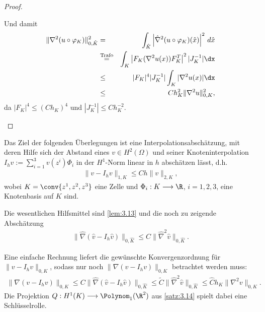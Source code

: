 \begin{proof}
\begin{enumerate}[a)]
        Und damit
        \begin{eqnarray*}
                \|\nabla^2 (u \circ \varphi_K)\|_{0,\hat K}^2
            &=& \int_{\hat K} \left|\hat \nabla^2 (u \circ \varphi_K)(\hat x)
                \right|^2 \,d\hat x \\
            &\stackrel{\text{Trafo}}{=}&
                \int_K \left|F_K(\nabla^2 u(x)) F_K^T\right|^2 |J_K^{-1}| \dx\\
            &\le& |F_K|^4 |J_K^{-1}| \int_K |\nabla^2 u(x)| \dx \\
            &\le& C h_K^2 \|\nabla^2 u\|_{0,K}^2,
        \end{eqnarray*}
        da $|F_K|^4 \le (C h_K)^4$ und $|J_K^{-1}| \le C h_K^{-2}$.   
    \end{enumerate}
\end{proof}


\begin{Ausblick}
    Das Ziel der folgenden Überlegungen ist eine Interpolationsabschätzung, mit deren Hilfe sich der Abstand eines $v \in H^2(\Omega)$ und seiner Knoteninterpolation $I_h v := \sum_{i=1}^3 v(z^i) \Phi_i$ in der $H^1$-Norm linear in $h$ abschätzen lässt, d.h.
    \begin{eqnarray*}
        \|v - I_h v\|_{1,K} \le C h \|v\|_{2,K},
    \end{eqnarray*}
    wobei $K = \conv\{z^1,z^2,z^3\}$ eine Zelle und $\Phi_i : K \longrightarrow \R$, $i=1,2,3$, eine Knotenbasis auf $K$ sind.

    Die wesentlichen Hilfsmittel sind \eqref{lem:3.13} und die noch zu zeigende Abschätzung
    \begin{eqnarray*}
        \|\hat \nabla (\hat v - I_h \hat v)\|_{0,\hat K}
        \le C \|\hat \nabla^2 \hat v\|_{0,\hat K}.
    \end{eqnarray*}

    Eine einfache Rechnung liefert die gewünschte Konvergenzordnung für $\|v - I_h v\|_{0,K}$, sodass nur noch $\|\nabla (v - I_h v) \|_{0,K}$ betrachtet werden muss:
    \begin{eqnarray*}
            \|\nabla (v - I_h v)\|_{0,K}
        \le C \|\hat \nabla (\hat v - I_h \hat v)\|_{0,\hat K}
        \le \tilde C \|\hat \nabla^2 \hat v\|_{0,\hat K}
        \le \hat C h_K \|\nabla^2 v\|_{0,K}.
    \end{eqnarray*}
    Die Projektion $Q: H^1(K) \longrightarrow \Polynom_1(\R^2)$ aus \eqref{satz:3.14} spielt dabei eine Schlüsselrolle.
\end{Ausblick}


